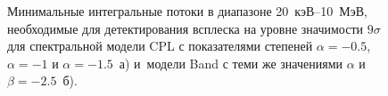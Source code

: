 \begin{figure}[h]
  \begin{minipage}[h]{0.5\textwidth}
  \end{minipage}
  \hfill
  \begin{minipage}[h]{0.5\textwidth}
  \end{minipage}
  \caption[Минимальные регистрируемые интегральные потоки в диапазоне 20~кэВ--10~МэВ.]
  {Минимальные интегральные потоки в диапазоне 20~кэВ--10~МэВ, необходимые для детектирования 
  всплеска на уровне значимости $9\sigma$ для спектральной модели CPL с 
  показателями степеней $\alpha=-0.5$, $\alpha=-1$ и $\alpha=-1.5$~а) и~модели Band с теми же значениями $\alpha$ и $\beta=-2.5$~б).}
  \label{img:KW_min_fluence}  
\end{figure}